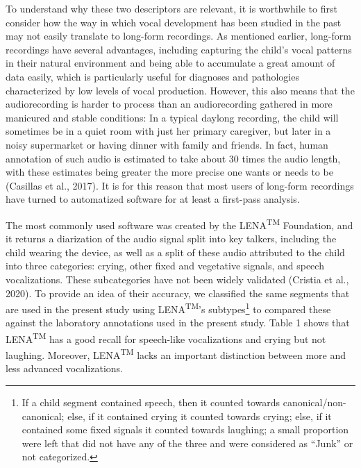 \documentclass[english,,man,floatsintext]{apa6}
\begin{document}
To understand why these two descriptors are relevant, it is worthwhile to first consider how the way in which vocal development has been studied in the past may not easily translate to long-form recordings. As mentioned earlier, long-form recordings have several advantages, including capturing the child's vocal patterns in their natural environment and being able to accumulate a great amount of data easily, which is particularly useful for diagnoses and pathologies characterized by low levels of vocal production. However, this also means that the audiorecording is harder to process than an audiorecording gathered in more manicured and stable conditions: In a typical daylong recording, the child will sometimes be in a quiet room with just her primary caregiver, but later in a noisy supermarket or having dinner with family and friends. In fact, human annotation of such audio is estimated to take about 30 times the audio length, with these estimates being greater the more precise one wants or needs to be (Casillas et al., 2017). It is for this reason that most users of long-form recordings have turned to automatized software for at least a first-pass analysis.

The most commonly used software was created by the LENA\textsuperscript{TM} Foundation, and it returns a diarization of the audio signal split into key talkers, including the child wearing the device, as well as a split of these audio attributed to the child into three categories: crying, other fixed and vegetative signals, and speech vocalizations. These subcategories have not been widely validated (Cristia et al., 2020). To provide an idea of their accuracy, we classified the same segments that are used in the present study using LENA\textsuperscript{TM}'s subtypes\footnote{If a child segment contained speech, then it counted towards canonical/non-canonical; else, if it contained crying it counted towards crying; else, if it contained some fixed signals it counted towards laughing; a small proportion were left that did not have any of the three and were considered as \enquote{Junk} or not categorized.} to compared these against the laboratory annotations used in the present study. Table 1 shows that LENA\textsuperscript{TM} has a good recall for speech-like vocalizations and crying but not laughing. Moreover, LENA\textsuperscript{TM} lacks an important distinction between more and less advanced vocalizations.
\end{document}
